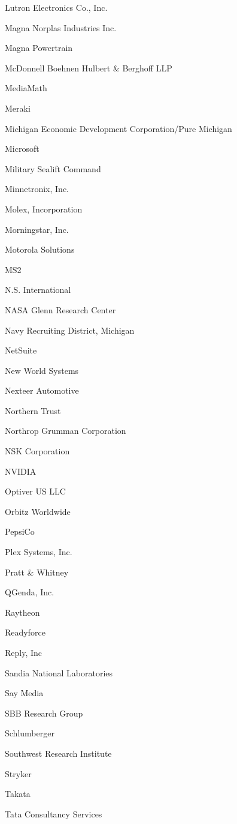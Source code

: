 \documentclass[twoside]{article}
\begin{document}
\begin{center}
\begin{multicols}{5}
\begin{FlushLeft}
\begin{compactitem}
\item Lutron Electronics Co., Inc.
\item Magna Norplas Industries Inc.
\item Magna Powertrain
\item McDonnell Boehnen Hulbert \& Berghoff LLP
\item MediaMath
\item Meraki
\item Michigan Economic Development Corporation/Pure Michigan
\item Microsoft
\item Military Sealift Command
\item Minnetronix, Inc.
\item Molex, Incorporation
\item Morningstar, Inc.
\item Motorola Solutions
\item MS2
\item N.S. International
\item NASA Glenn Research Center
\item Navy Recruiting District, Michigan
\item NetSuite
\item New World Systems
\item Nexteer Automotive
\item Northern Trust
\item Northrop Grumman Corporation
\item NSK Corporation
\item NVIDIA
\item Optiver US LLC
\item Orbitz Worldwide
\item PepsiCo
\item Plex Systems, Inc.
\item Pratt \& Whitney
\item QGenda, Inc.
\item Raytheon
\item Readyforce
\item Reply, Inc
\item Sandia National Laboratories
\item Say Media
\item SBB Research Group
\item Schlumberger
\item Southwest Research Institute
\item Stryker
\item Takata
\item Tata Consultancy Services

\end{compactitem}
\end{FlushLeft}
\end{multicols}
\end{center}
\end{document}
